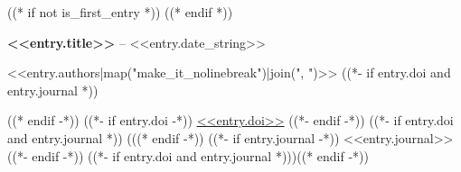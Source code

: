 ((* if not is_first_entry *))
\vspace{8pt}
((* endif *))

\textbf{<<entry.title>>} -- <<entry.date_string>>
\begin{highlights}
    \item <<entry.authors|map("make_it_nolinebreak")|join(", ")>>
    ((*- if entry.doi and entry.journal *)) \item ((* endif -*))
    ((*- if entry.doi -*))
    \href{<<entry.doi_url>>}{<<entry.doi>>}
    ((*- endif -*))
    ((*- if entry.doi and entry.journal *)) (((* endif -*))
    ((*- if entry.journal -*))
    <<entry.journal>>
    ((*- endif -*))
    ((*- if entry.doi and entry.journal *)))((* endif -*))
\end{highlights}
